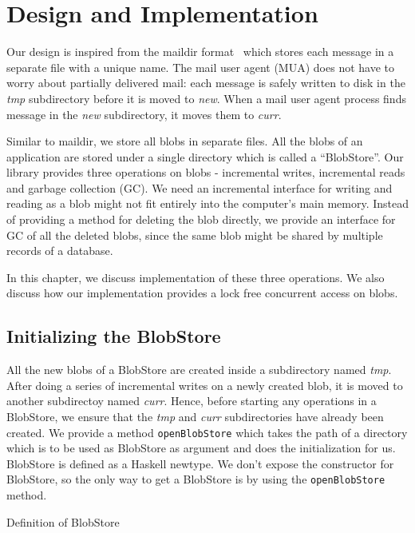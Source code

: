 \chapter{Design and Implementation}
\label{chap:design}

Our design is inspired from the maildir format~\cite{bernstein1995using} which stores each message in a separate file with a unique name. The mail user agent (MUA) does not have to worry about partially delivered mail: each message is safely written to disk in the \textit{tmp} subdirectory before it is moved to \textit{new}. When a mail user agent process finds message in the \textit{new} subdirectory, it moves them to \textit{curr}.

Similar to maildir, we store all blobs in separate files. All the blobs of an application are stored under a single directory which is called a ``BlobStore''.
Our library provides three operations on blobs - incremental writes, incremental reads and garbage collection (GC). We need an incremental interface for writing and reading as a blob might not fit entirely into the computer's main memory.
Instead of providing a method for deleting the blob directly, we provide an interface for GC of all the deleted blobs, since the same blob might be shared by multiple records of a database.

In this chapter, we discuss implementation of these three operations. We also discuss how our implementation provides a lock free concurrent access on blobs.

\section{Initializing the BlobStore}
All the new blobs of a BlobStore are created inside a subdirectory named \textit{tmp}. After doing a series of incremental writes on a newly created blob, it is moved to another subdirectoy named \textit{curr}. Hence, before starting any operations in a BlobStore, we ensure that the \textit{tmp} and \textit{curr} subdirectories have already been created.
We provide a method \texttt{openBlobStore} which takes the path of a directory which is to be used as BlobStore as argument and does the initialization for us.
BlobStore is defined as a Haskell newtype. We don't expose the constructor for BlobStore, so the only way to get a BlobStore is by using the \texttt{openBlobStore} method.

\begin{program}
  \caption{Definition of BlobStore}
  \label{prog:defblobstore}
  \inputminted{haskell}{hs/blobstore.hs}
\end{program}

